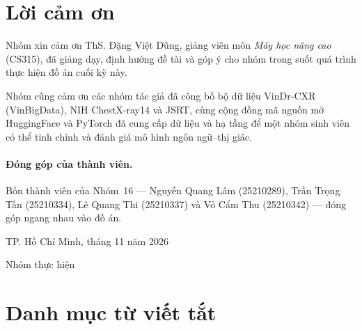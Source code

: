 
\section*{Lời cảm ơn}

Nhóm xin cảm ơn ThS. Đặng Việt Dũng, giảng viên môn \emph{Máy học nâng cao} (CS315),
đã giảng dạy, định hướng đề tài và góp ý cho nhóm trong suốt quá trình thực hiện đồ án cuối kỳ này.

Nhóm cũng cảm ơn các nhóm tác giả đã công bố bộ dữ liệu VinDr-CXR (VinBigData), NIH ChestX-ray14 và JSRT,
cùng cộng đồng mã nguồn mở HuggingFace và PyTorch đã cung cấp dữ liệu và hạ tầng để một nhóm sinh viên có thể tinh chỉnh
và đánh giá mô hình ngôn ngữ--thị giác.

\paragraph{Đóng góp của thành viên.} Bốn thành viên của Nhóm~16 --- Nguyễn Quang Lâm (25210289),
Trần Trọng Tấn (25210334), Lê Quang Thi (25210337) và Vỏ Cẩm Thu (25210342) --- đóng góp ngang nhau
vào đồ án.

\vspace{1em}
\hfill TP. Hồ Chí Minh, tháng 11 năm 2026

\hfill Nhóm thực hiện

\clearpage


\clearpage
{
\tableofcontents
\clearpage
\listoffigures
{}
\vspace{1.5em}
\listoftables
{}
}

\vspace{1.5em}
\section*{Danh mục từ viết tắt}

